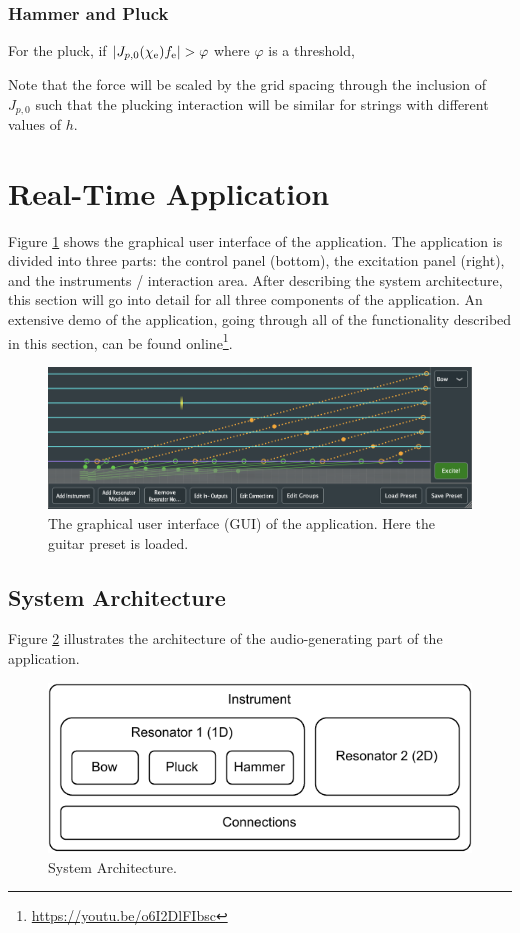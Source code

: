 \documentclass{article}
\begin{document}
\subsubsection{Hammer and Pluck}


For the pluck, if $|J_{p, 0}(\chi_{\text{e}}) f_{\text{e}}| > \varphi$ where $\varphi$ is a threshold, 

Note that the force will be scaled by the grid spacing through the inclusion of $J_{p, 0}$ such that the plucking interaction will be similar for strings with different values of $h$. 

\section{Real-Time Application}

Figure \ref{fig:gui} shows the graphical user interface of the application. The application is divided into three parts: the control panel (bottom), the excitation panel (right), and the instruments / interaction area. After describing the system architecture, this section will go into detail for all three components of the application.
An extensive demo of the application, going through all of the functionality described in this section, can be found online\footnote{\url{https://youtu.be/o6I2DlFIbsc}}.
\begin{figure}[t]
    \centering
    \includegraphics[width = \textwidth]{GUI.png}
    \caption{The graphical user interface (GUI) of the application. Here the guitar preset is loaded.}
    \label{fig:gui}
\end{figure}
\subsection{System Architecture}
Figure \ref{fig:systemArchitecture} illustrates the architecture of the audio-generating part of the application.

\begin{figure}[h]
    \centering
    \includegraphics[width = \columnwidth]{systemArchitectureSMC2022.pdf}
    \caption{System Architecture. }
    \label{fig:systemArchitecture}
\end{figure}
\end{document}
